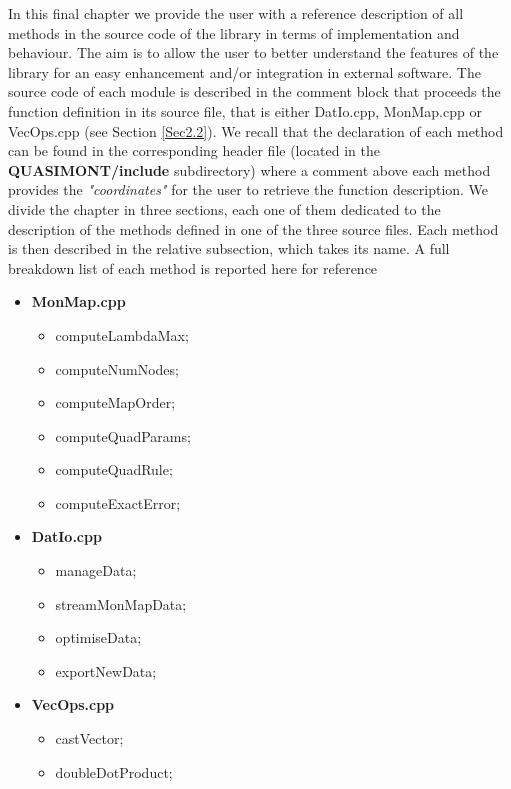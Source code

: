 \documentclass[a4paper, twosided]{book}
\begin{document}
In this final chapter we provide the user with a reference description of all methods in the source code of the library in terms of implementation and behaviour. The aim is to allow the user to better understand the features of the library for an easy enhancement and/or integration in external software. The source code of each module is described in the comment block that proceeds the function definition in its source file, that is either \colorbox{poliGrayBlue}{DatIo.cpp}, \colorbox{poliGrayBlue}{MonMap.cpp} or \colorbox{poliGrayBlue}{VecOps.cpp} (see Section \ref{Sec2.2}). We recall that the declaration of each method can be found in the corresponding header file (located in the \colorbox{poliGrayBlue}{\textbf{QUASIMONT/include}} subdirectory) where a comment above each method provides the \textsl{"coordinates"} for the user to retrieve the function description. We divide the chapter in three sections, each one of them dedicated to the description of the methods defined in one of the three source files. Each method is then described in the relative subsection, which takes its name. A full breakdown list of each method is reported here for reference

\begin{itemize}
    \item \ttfamily \color{poliDarkBlue}\textbf{MonMap.cpp} \color{black}
          \begin{itemize}
                 \item \ttfamily computeLambdaMax;
                 \item \ttfamily computeNumNodes;
                 \item \ttfamily computeMapOrder;
                 \item \ttfamily computeQuadParams;
                 \item \ttfamily computeQuadRule;
                 \item \ttfamily computeExactError;
          \end{itemize}
          
   \item \ttfamily \color{poliDarkBlue}\textbf{DatIo.cpp} \color{black}
          \begin{itemize}
                 \item \ttfamily manageData;
                 \item \ttfamily streamMonMapData;
                 \item \ttfamily optimiseData;
                 \item \ttfamily exportNewData;
          \end{itemize}
          
    \item \ttfamily \color{poliDarkBlue}\textbf{VecOps.cpp} \color{black}
          \begin{itemize}
                 \item \ttfamily castVector;
                 \item \ttfamily doubleDotProduct;
          \end{itemize}
\end{itemize}
\end{document}

